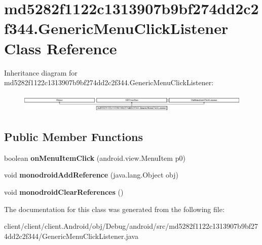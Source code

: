\hypertarget{classmd5282f1122c1313907b9bf274dd2c2f344_1_1GenericMenuClickListener}{}\section{md5282f1122c1313907b9bf274dd2c2f344.\+Generic\+Menu\+Click\+Listener Class Reference}
\label{classmd5282f1122c1313907b9bf274dd2c2f344_1_1GenericMenuClickListener}
Inheritance diagram for md5282f1122c1313907b9bf274dd2c2f344.\+Generic\+Menu\+Click\+Listener\+:\begin{figure}[H]
\begin{center}
\leavevmode
\includegraphics[height=0.906149cm]{classmd5282f1122c1313907b9bf274dd2c2f344_1_1GenericMenuClickListener}
\end{center}
\end{figure}
\subsection*{Public Member Functions}
\begin{DoxyCompactItemize}
\item 
\hypertarget{classmd5282f1122c1313907b9bf274dd2c2f344_1_1GenericMenuClickListener_a3c2715fb8f5f5b1eaa0ddb0de7fcbd6d}{}boolean {\bfseries on\+Menu\+Item\+Click} (android.\+view.\+Menu\+Item p0)\label{classmd5282f1122c1313907b9bf274dd2c2f344_1_1GenericMenuClickListener_a3c2715fb8f5f5b1eaa0ddb0de7fcbd6d}

\item 
\hypertarget{classmd5282f1122c1313907b9bf274dd2c2f344_1_1GenericMenuClickListener_a555aed57155a8016a9646503b694bbe2}{}void {\bfseries monodroid\+Add\+Reference} (java.\+lang.\+Object obj)\label{classmd5282f1122c1313907b9bf274dd2c2f344_1_1GenericMenuClickListener_a555aed57155a8016a9646503b694bbe2}

\item 
\hypertarget{classmd5282f1122c1313907b9bf274dd2c2f344_1_1GenericMenuClickListener_ab79f1323099406b93294ff783ef2a03b}{}void {\bfseries monodroid\+Clear\+References} ()\label{classmd5282f1122c1313907b9bf274dd2c2f344_1_1GenericMenuClickListener_ab79f1323099406b93294ff783ef2a03b}

\end{DoxyCompactItemize}


The documentation for this class was generated from the following file\+:\begin{DoxyCompactItemize}
\item 
client/client/client.\+Android/obj/\+Debug/android/src/md5282f1122c1313907b9bf274dd2c2f344/Generic\+Menu\+Click\+Listener.\+java\end{DoxyCompactItemize}
